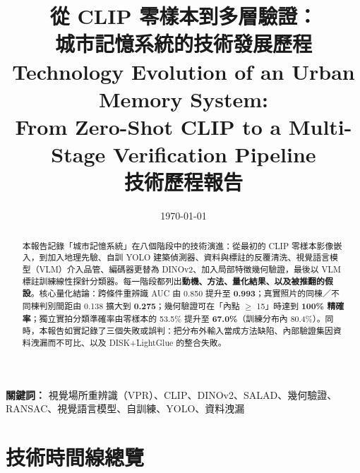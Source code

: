 \documentclass[11pt,a4paper,fontset=windows]{ctexart}
\title{\vspace{-1.1cm}\textbf{\Large 從 CLIP 零樣本到多層驗證：\\[0.15cm]
城市記憶系統的技術發展歷程}\\[0.35cm]
\large Technology Evolution of an Urban Memory System:\\[0.1cm]
\large From Zero-Shot CLIP to a Multi-Stage Verification Pipeline\\[0.4cm]
\normalsize 技術歷程報告}
\author{}
\date{\today}
\begin{document}
\maketitle
\thispagestyle{fancy}

\begin{abstract}
\noindent
本報告記錄「城市記憶系統」在八個階段中的技術演進：從最初的 CLIP 零樣本影像嵌入，到加入地理先驗、自訓 YOLO 建築偵測器、資料與標註的反覆清洗、視覺語言模型（VLM）介入品管、編碼器更替為 DINOv2、加入局部特徵幾何驗證，最後以 VLM 標註訓練線性探針分類器。每一階段都列出\textbf{動機、方法、量化結果、以及被推翻的假設}。核心量化結論：跨條件重辨識 AUC 由 0.850 提升至 \textbf{0.993}；真實照片的同棟／不同棟判別間距由 0.138 擴大到 \textbf{0.275}；幾何驗證可在「內點 $\ge$ 15」時達到 \textbf{100\% 精確率}；獨立實拍分類準確率由零樣本的 53.5\% 提升至 \textbf{67.0\%}（訓練分布內 80.4\%）。同時，本報告如實記錄了三個失敗或誤判：把分布外輸入當成方法缺陷、內部驗證集因資料洩漏而不可比、以及 DISK+LightGlue 的整合失敗。
\end{abstract}

\vspace{0.2cm}
\noindent\textbf{關鍵詞：} 視覺場所重辨識（VPR）、CLIP、DINOv2、SALAD、幾何驗證、RANSAC、視覺語言模型、自訓練、YOLO、資料洩漏

\newpage
\tableofcontents
\newpage

\section{技術時間線總覽}
\end{document}
